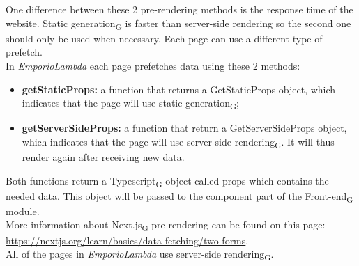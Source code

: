 One difference between these 2 pre-rendering methods is the response time of the website.
Static generation\textsubscript{G} is faster than server-side rendering so the second one should only be used when necessary. Each page can use a different type of prefetch.\\
In \textit{EmporioLambda} each page prefetches data using these 2 methods:
\begin{itemize}
\item \textbf{getStaticProps:} a function that returns a GetStaticProps object, which indicates that the page will use static generation\textsubscript{G};
\item \textbf{getServerSideProps:} a function that return a GetServerSideProps object, which indicates that the page will use server-side rendering\textsubscript{G}. It will thus render again after receiving new data.
\end{itemize}
Both functions return a Typescript\textsubscript{G} object called props which contains the needed data. This object will be passed to the component part of the Front-end\textsubscript{G} module.\\
More information about Next.js\textsubscript{G} pre-rendering can be found on this page:\\
\url{https://nextjs.org/learn/basics/data-fetching/two-forms}.\\
All of the pages in \textit{EmporioLambda} use server-side rendering\textsubscript{G}.